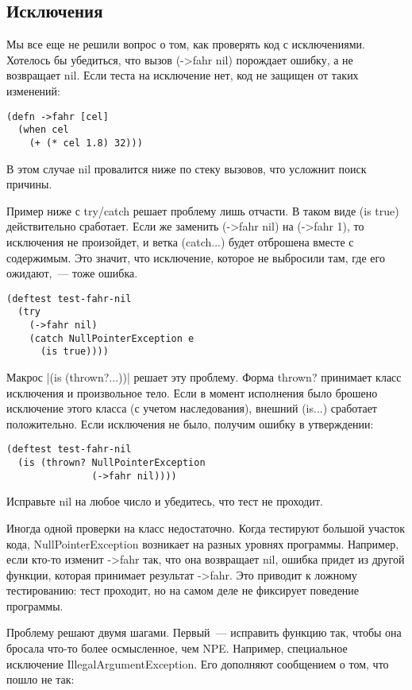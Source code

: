 \subsection{Исключения}

Мы все еще не решили вопрос о том, как проверять код с исключениями. Хотелось бы
убедиться, что вызов (->fahr nil) порождает ошибку, а не возвращает nil. Если
теста на исключение нет, код не защищен от таких изменений:

\begin{verbatim}
(defn ->fahr [cel]
  (when cel
    (+ (* cel 1.8) 32)))
\end{verbatim}

В этом случае nil провалится ниже по стеку вызовов, что усложнит поиск причины.

Пример ниже с try/catch решает проблему лишь отчасти. В таком виде (is true)
действительно сработает. Если же заменить (->fahr nil) на (->fahr 1), то
исключения не произойдет, и ветка (catch...) будет отброшена вместе с
содержимым. Это значит, что исключение, которое не выбросили там, где его
ожидают,~--- тоже ошибка.

\begin{verbatim}
(deftest test-fahr-nil
  (try
    (->fahr nil)
    (catch NullPointerException e
      (is true))))
\end{verbatim}

Макрос \spverb|(is (thrown?...))| решает эту проблему. Форма thrown? принимает класс
исключения и произвольное тело. Если в момент исполнения было брошено исключение
этого класса (с учетом наследования), внешний (is...) сработает
положительно. Если исключения не было, получим ошибку в утверждении:

\begin{verbatim}
(deftest test-fahr-nil
  (is (thrown? NullPointerException
               (->fahr nil))))
\end{verbatim}

Исправьте nil на любое число и убедитесь, что тест не проходит.

Иногда одной проверки на класс недостаточно. Когда тестируют большой участок
кода, NullPointerException возникает на разных уровнях программы. Например, если
кто-то изменит ->fahr так, что она возвращает nil, ошибка придет из другой
функции, которая принимает результат ->fahr. Это приводит к ложному
тестированию: тест проходит, но на самом деле не фиксирует поведение программы.

Проблему решают двумя шагами. Первый~--- исправить функцию так, чтобы она бросала
что-то более осмысленное, чем NPE. Например, специальное исключение
IllegalArgumentException. Его дополняют сообщением о том, что пошло не так:

